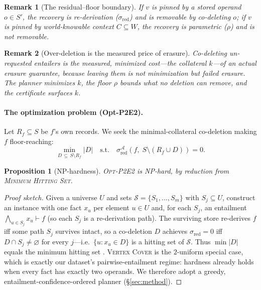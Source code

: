 \documentclass[10pt,twocolumn,letterpaper]{article}
\theoremstyle{definition}
\theoremstyle{plain}
\newtheorem{proposition}{Proposition}
\newtheorem{remark}{Remark}
\newcommand{\sred}{\sigma_{\mathrm{red}}}
\newcommand{\Adv}{\mathcal{A}}
\begin{document}
\begin{remark}[The residual--floor boundary]\label{rmk:boundary}
If $v$ is pinned by a stored operand $o\in S'$, the recovery is re-derivation
($\sred$) and is removable by co-deleting $o$; if $v$ is pinned by world-knowable
context $C\subseteq W$, the recovery is parametric ($\rho$) and is \emph{not}
removable.
\end{remark}

\begin{remark}[Over-deletion is the measured price of erasure]\label{rmk:price}
Co-deleting un-requested entailers is the \emph{measured, minimized} cost---the
collateral $k$---of an actual erasure guarantee, because leaving them is not
minimization but \emph{failed} erasure. The planner minimizes $k$, the floor
$\rho$ bounds what no deletion can remove, and the certificate surfaces $k$.
\end{remark}

\paragraph{The optimization problem (Opt-P2E2).}
Let $R_f\subseteq S$ be $f$'s own records. We seek the minimal-collateral
co-deletion making $f$ floor-reaching:
\begin{equation}
  \min_{D\,\subseteq\, S\setminus R_f} |D|
  \quad\text{s.t.}\quad
  \sred^{\Adv}\!\left(f,\; S\setminus(R_f\cup D)\right) = 0 .
\end{equation}

\begin{proposition}[NP-hardness]\label{prop:nphard}
\textsc{Opt-P2E2} is NP-hard, by reduction from \textsc{Minimum Hitting Set}.
\end{proposition}
\begin{proof}[Proof sketch]
Given a universe $U$ and sets $\mathcal{S}=\{S_1,\dots,S_m\}$ with
$S_j\subseteq U$, construct an instance with one fact $x_u$ per element $u\in U$
and, for each $S_j$, an entailment $\bigwedge_{u\in S_j} x_u \vdash f$ (so each
$S_j$ is a re-derivation path). The surviving store re-derives $f$ iff some path
$S_j$ survives intact, so a co-deletion $D$ achieves $\sred=0$ iff
$D\cap S_j\neq\varnothing$ for every $j$---i.e.\ $\{u:x_u\in D\}$ is a hitting set
of $\mathcal{S}$. Thus $\min|D|$ equals the minimum hitting set
\citep{karp1972reducibility}. \textsc{Vertex Cover} is the $2$-uniform special
case, which is exactly our dataset's pairwise-entailment regime: hardness already
holds when every fact has exactly two operands. We therefore adopt a greedy,
entailment-confidence-ordered planner (\S\ref{sec:method}).
\end{proof}
\end{document}

